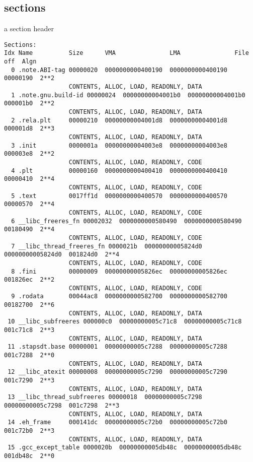\subsection{sections}

\begin{frame}[fragile,label=sectHeader]{a section header}
\begin{Verbatim}[fontsize=\tiny]
Sections:
Idx Name          Size      VMA               LMA               File off  Algn
  0 .note.ABI-tag 00000020  0000000000400190  0000000000400190  00000190  2**2
                  CONTENTS, ALLOC, LOAD, READONLY, DATA
  1 .note.gnu.build-id 00000024  00000000004001b0  00000000004001b0  000001b0  2**2
                  CONTENTS, ALLOC, LOAD, READONLY, DATA
  2 .rela.plt     00000210  00000000004001d8  00000000004001d8  000001d8  2**3
                  CONTENTS, ALLOC, LOAD, READONLY, DATA
  3 .init         0000001a  00000000004003e8  00000000004003e8  000003e8  2**2
                  CONTENTS, ALLOC, LOAD, READONLY, CODE
  4 .plt          00000160  0000000000400410  0000000000400410  00000410  2**4
                  CONTENTS, ALLOC, LOAD, READONLY, CODE
  5 .text         0017ff1d  0000000000400570  0000000000400570  00000570  2**4
                  CONTENTS, ALLOC, LOAD, READONLY, CODE
  6 __libc_freeres_fn 00002032  0000000000580490  0000000000580490  00180490  2**4
                  CONTENTS, ALLOC, LOAD, READONLY, CODE
  7 __libc_thread_freeres_fn 0000021b  00000000005824d0  00000000005824d0  001824d0  2**4
                  CONTENTS, ALLOC, LOAD, READONLY, CODE
  8 .fini         00000009  00000000005826ec  00000000005826ec  001826ec  2**2
                  CONTENTS, ALLOC, LOAD, READONLY, CODE
  9 .rodata       00044ac8  0000000000582700  0000000000582700  00182700  2**6
                  CONTENTS, ALLOC, LOAD, READONLY, DATA
 10 __libc_subfreeres 000000c0  00000000005c71c8  00000000005c71c8  001c71c8  2**3
                  CONTENTS, ALLOC, LOAD, READONLY, DATA
 11 .stapsdt.base 00000001  00000000005c7288  00000000005c7288  001c7288  2**0
                  CONTENTS, ALLOC, LOAD, READONLY, DATA
 12 __libc_atexit 00000008  00000000005c7290  00000000005c7290  001c7290  2**3
                  CONTENTS, ALLOC, LOAD, READONLY, DATA
 13 __libc_thread_subfreeres 00000018  00000000005c7298  00000000005c7298  001c7298  2**3
                  CONTENTS, ALLOC, LOAD, READONLY, DATA
 14 .eh_frame     000141dc  00000000005c72b0  00000000005c72b0  001c72b0  2**3
                  CONTENTS, ALLOC, LOAD, READONLY, DATA
 15 .gcc_except_table 0000020b  00000000005db48c  00000000005db48c  001db48c  2**0

\end{Verbatim}
\end{frame}
